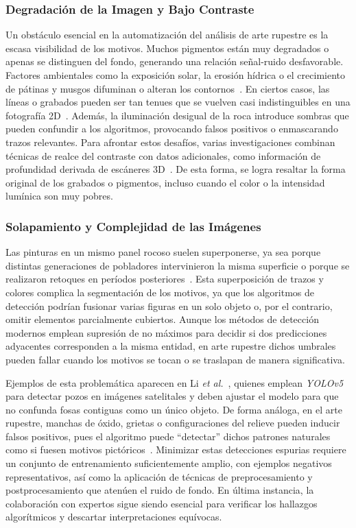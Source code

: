 \subsubsection*{Degradación de la Imagen y Bajo Contraste}

Un obstáculo esencial en la automatización del análisis de arte rupestre es la escasa visibilidad de los motivos.
Muchos pigmentos están muy degradados o apenas se distinguen del fondo, generando una relación señal-ruido desfavorable.
Factores ambientales como la exposición solar, la erosión hídrica o el crecimiento de pátinas y musgos difuminan o alteran los contornos~\cite{horn2022,suhaimi2023}.
En ciertos casos, las líneas o grabados pueden ser tan tenues que se vuelven casi indistinguibles en una fotografía 2D~\cite{horn2022}.
Además, la iluminación desigual de la roca introduce sombras que pueden confundir a los algoritmos, provocando falsos positivos o enmascarando trazos relevantes.
Para afrontar estos desafíos, varias investigaciones combinan técnicas de realce del contraste con datos adicionales, como información de profundidad derivada de escáneres 3D~\cite{jalandoni2022}.
De esta forma, se logra resaltar la forma original de los grabados o pigmentos, incluso cuando el color o la intensidad lumínica son muy pobres.

\subsubsection*{Solapamiento y Complejidad de las Imágenes}

Las pinturas en un mismo panel rocoso suelen superponerse, ya sea porque distintas generaciones de pobladores intervinieron la misma superficie o porque se realizaron retoques en períodos posteriores~\cite{horn2022}.
Esta superposición de trazos y colores complica la segmentación de los motivos, ya que los algoritmos de detección podrían fusionar varias figuras en un solo objeto o, por el contrario, omitir elementos parcialmente cubiertos.
Aunque los métodos de detección modernos emplean supresión de no máximos para decidir si dos predicciones adyacentes corresponden a la misma entidad, en arte rupestre dichos umbrales pueden fallar cuando los motivos se tocan o se traslapan de manera significativa.

Ejemplos de esta problemática aparecen en Li \textit{et al.}~\cite{li2022}, quienes emplean \textit{YOLOv5} para detectar pozos en imágenes satelitales y deben ajustar el modelo para que no confunda fosas contiguas como un único objeto.
De forma análoga, en el arte rupestre, manchas de óxido, grietas o configuraciones del relieve pueden inducir falsos positivos, pues el algoritmo puede “detectar” dichos patrones naturales como si fuesen motivos pictóricos~\cite{horn2022}.
Minimizar estas detecciones espurias requiere un conjunto de entrenamiento suficientemente amplio, con ejemplos negativos representativos, así como la aplicación de técnicas de preprocesamiento y postprocesamiento que atenúen el ruido de fondo.
En última instancia, la colaboración con expertos sigue siendo esencial para verificar los hallazgos algorítmicos y descartar interpretaciones equívocas.

